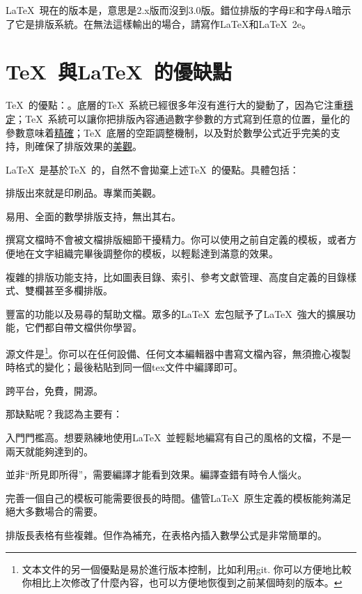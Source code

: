 \LaTeX\ 現在的版本是\LaTeXe ，意思是2.x版而沒到3.0版。錯位排版的字母E和字母A暗示了它是排版系統。在無法這樣輸出的場合，請寫作LaTeX和LaTeX~2e。

\section{\TeX\ 與\LaTeX\ 的優缺點}
\TeX\ 的優點：。底層的\TeX\ 系統已經很多年沒有進行大的變動了，因為它注重\uline{穩定}；\TeX\ 系統可以讓你把排版內容通過數字參數的方式寫到任意的位置，量化的參數意味着\uline{精確}；\TeX\ 底層的空距調整機制，以及對於數學公式近乎完美的支持，則確保了排版效果的\uline{美觀}。

\LaTeX\ 是基於\TeX\ 的，自然不會拋棄上述\TeX\ 的優點。具體包括：
\begin{feai}
\item 排版出來就是印刷品。專業而美觀。
\item 易用、全面的數學排版支持，無出其右。
\item 撰寫文檔時不會被文檔排版細節干擾精力。你可以使用之前自定義的模板，或者方便地在文字組織完畢後調整你的模板，以輕鬆達到滿意的效果。
\item 複雜的排版功能支持，比如圖表目錄、索引、參考文獻管理、高度自定義的目錄樣式、雙欄甚至多欄排版。
\item 豐富的功能以及易尋的幫助文檔。眾多的\LaTeX\ 宏包賦予了\LaTeX\ 強大的擴展功能，它們都自帶文檔供你學習。
\item 源文件是\footnote{文本文件的另一個優點是易於進行版本控制，比如利用git. 你可以方便地比較你相比上次修改了什麼內容，也可以方便地恢復到之前某個時刻的版本。}。你可以在任何設備、任何文本編輯器中書寫文檔內容，無須擔心複製時格式的變化；最後粘貼到同一個tex文件中編譯即可。
\item 跨平台，免費，開源。
\end{feai}

那缺點呢？我認為主要有：
\begin{feai}
\item 入門門檻高。想要熟練地使用\LaTeX\ 並輕鬆地編寫有自己的風格的文檔，不是一兩天就能夠達到的。
\item 並非“所見即所得”，需要編譯才能看到效果。編譯查錯有時令人惱火。
\item 完善一個自己的模板可能需要很長的時間。儘管\LaTeX\ 原生定義的模板能夠滿足絕大多數場合的需要。
\item 排版長表格有些複雜。但作為補充，在表格內插入數學公式是非常簡單的。
\end{feai}

